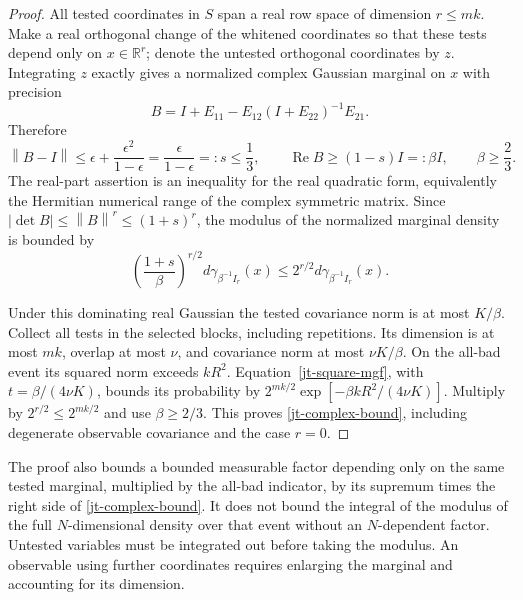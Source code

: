 \documentclass[11pt]{article}
\theoremstyle{remark}
\newcommand{\norm}[1]{\left\|#1\right\|}
\begin{document}
\begin{proof}
All tested coordinates in $S$ span a real row space of dimension
$r\le mk$. Make a real orthogonal change of the whitened
coordinates so that these tests depend only on $x\in\mathbb R^r$;
denote the untested orthogonal coordinates by $z$. Integrating
$z$ exactly gives a normalized complex Gaussian marginal on
$x$ with precision
\begin{equation}\label{jt-marginal-precision}
 B=I+E_{11}-E_{12}(I+E_{22})^{-1}E_{21}.
\end{equation}
Therefore
\begin{equation}\label{jt-marginal-control}
 \norm{B-I}\le\epsilon+\frac{\epsilon^2}{1-\epsilon}
       =\frac{\epsilon}{1-\epsilon}=:s\le\frac13,
 \qquad \operatorname{Re}B\ge(1-s)I=:\beta I,
 \qquad \beta\ge\frac23.
\end{equation}
The real-part assertion is an inequality for the real quadratic
form, equivalently the Hermitian numerical range of the complex
symmetric matrix. Since
$|\det B|\le\norm B^r\le(1+s)^r$, the modulus of the
normalized marginal density is bounded by
\begin{equation}\label{jt-marginal-domination}
 \left(\frac{1+s}{\beta}\right)^{r/2}
                d\gamma_{\beta^{-1}I_r}(x)
 \le 2^{r/2}d\gamma_{\beta^{-1}I_r}(x).
\end{equation}

Under this dominating real Gaussian the tested covariance norm
is at most $K/\beta$. Collect all tests in the selected blocks,
including repetitions. Its dimension is at most $mk$, overlap
at most $\nu$, and covariance norm at most $\nu K/\beta$.
On the all-bad event its squared norm exceeds $kR^2$.
Equation~\eqref{jt-square-mgf}, with
$t=\beta/(4\nu K)$, bounds its probability by
$2^{mk/2}\exp[-\beta kR^2/(4\nu K)]$.
Multiply by $2^{r/2}\le2^{mk/2}$ and use $\beta\ge2/3$.
This proves \eqref{jt-complex-bound}, including degenerate
observable covariance and the case $r=0$.
\end{proof}

The proof also bounds a bounded measurable factor depending
only on the same tested marginal, multiplied by the all-bad
indicator, by its supremum times the right side of
\eqref{jt-complex-bound}. It does not bound the integral of
the modulus of the full $N$-dimensional density over that
event without an $N$-dependent factor. Untested variables must
be integrated out before taking the modulus. An observable
using further coordinates requires enlarging the marginal
and accounting for its dimension.
\end{document}

